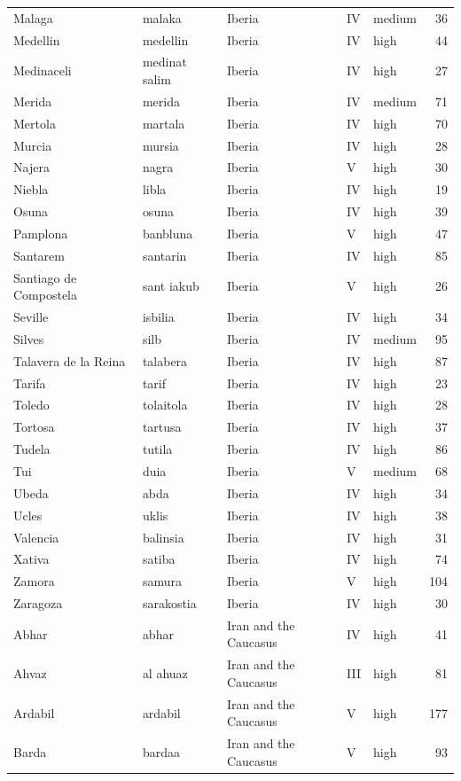 \documentclass[11pt,a4paper]{article}
\begin{document}
{\begin{longtable}{p{4.6cm}p{3.0cm}p{3.6cm}llr}
Malaga & malaka & Iberia & IV & medium & 36\\
Medellin & medellin & Iberia & IV & high & 44\\
Medinaceli & medinat salim & Iberia & IV & high & 27\\
Merida & merida & Iberia & IV & medium & 71\\
Mertola & martala & Iberia & IV & high & 70\\
Murcia & mursia & Iberia & IV & high & 28\\
Najera & nagra & Iberia & V & high & 30\\
Niebla & libla & Iberia & IV & high & 19\\
Osuna & osuna & Iberia & IV & high & 39\\
Pamplona & banbluna & Iberia & V & high & 47\\
Santarem & santarin & Iberia & IV & high & 85\\
Santiago de Compostela & sant iakub & Iberia & V & high & 26\\
Seville & isbilia & Iberia & IV & high & 34\\
Silves & silb & Iberia & IV & medium & 95\\
Talavera de la Reina & talabera & Iberia & IV & high & 87\\
Tarifa & tarif & Iberia & IV & high & 23\\
Toledo & tolaitola & Iberia & IV & high & 28\\
Tortosa & tartusa & Iberia & IV & high & 37\\
Tudela & tutila & Iberia & IV & high & 86\\
Tui & duia & Iberia & V & medium & 68\\
Ubeda & abda & Iberia & IV & high & 34\\
Ucles & uklis & Iberia & IV & high & 38\\
Valencia & balinsia & Iberia & IV & high & 31\\
Xativa & satiba & Iberia & IV & high & 74\\
Zamora & samura & Iberia & V & high & 104\\
Zaragoza & sarakostia & Iberia & IV & high & 30\\
Abhar & abhar & Iran and the Caucasus & IV & high & 41\\
Ahvaz & al ahuaz & Iran and the Caucasus & III & high & 81\\
Ardabil & ardabil & Iran and the Caucasus & V & high & 177\\
Barda & bardaa & Iran and the Caucasus & V & high & 93\\

\end{longtable}}
\end{document}
